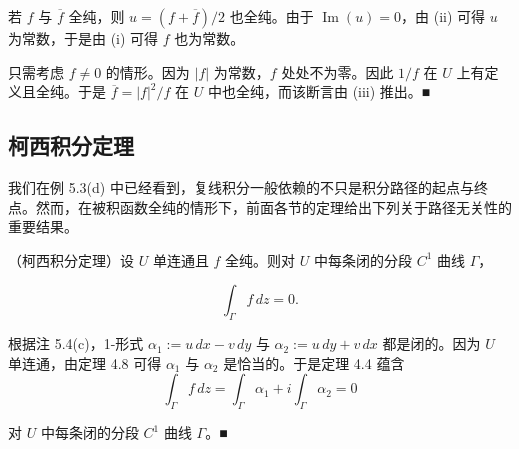 \begin{remark}
\begin{subitems}
若 $ f $ 与 $ \overline{f} $ 全纯，则 $ u = (f + \overline{f})/2 $ 也全纯。由于 $ \operatorname{Im}(u) = 0 $，由 (ii) 可得 $ u $ 为常数，于是由 (i) 可得 $ f $ 也为常数。

\item[（iv）]

只需考虑 $ f \ne 0 $ 的情形。因为 $ |f| $ 为常数，$ f $ 处处不为零。因此 $ 1/f $ 在 $ U $ 上有定义且全纯。于是 $ \overline{f} = |f|^{2}/f $ 在 $ U $ 中也全纯，而该断言由 (iii) 推出。\nobreak\hspace{0.35em}■

\end{subitems}

\end{remark}

\subsection*{柯西积分定理}

我们在例 5.3(d) 中已经看到，复线积分一般依赖的不只是积分路径的起点与终点。然而，在被积函数全纯的情形下，前面各节的定理给出下列关于路径无关性的重要结果。

\begin{theorem}

（柯西积分定理）设 $ U $ 单连通且 $ f $ 全纯。则对 $ U $ 中每条闭的分段 $ C^{1} $ 曲线 $ \Gamma $，

\[
\int_{\Gamma}f\,dz = 0 .
\]

\proofhead
根据注 5.4(c)，1-形式 $ \alpha_{1} := u\,dx - v\,dy $ 与 $ \alpha_{2} := u\,dy + v\,dx $ 都是闭的。因为 $ U $ 单连通，由定理 4.8 可得 $ \alpha_{1} $ 与 $ \alpha_{2} $ 是恰当的。于是定理 4.4 蕴含
\[
\int_{\Gamma}f\,dz = \int_{\Gamma}\alpha_{1} + i\int_{\Gamma}\alpha_{2} = 0
\]

对 $ U $ 中每条闭的分段 $ C^{1} $ 曲线 $ \Gamma $。\nobreak\hspace{0.35em}■

\end{theorem}

